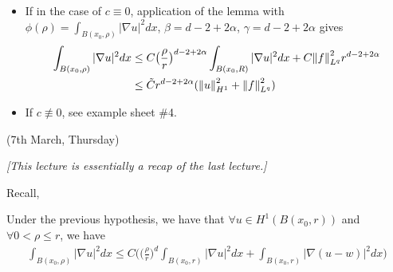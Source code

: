\documentclass[12pt,a4paper]{article}
\newenvironment{proof}
{\begin{changemargin}{0.5cm}{0.5cm} 
	}%
	{\end{changemargin}
}
\newenvironment{subproof}
{\begin{changemargin}{0.5cm}{0.5cm} 
	}%
	{\end{changemargin}
}
\newenvironment{p}
{\begin{proof} 
	}%
	{\end{proof}
}
\begin{document}
\begin{p}
\begin{subproof}
\eos
\end{subproof}
\begin{itemize}
\item If in the case of $c\equiv 0$, application of the lemma with $\phi(\rho) = \int_{B(x_0, \rho)} |\nabla u|^2 dx$, $\beta =d-2+2\alpha$, $\gamma =d-2+2\alpha$ gives
\begin{align*}
\int_{B(x_0, \rho)} |\nabla u|^2 dx & \leq C \big( \frac{\rho}{r} \big)^{d-2+2\alpha} \int_{B(x_0, R)} |\nabla u|^2 dx + C \snorms{f}{L^q}^2 r^{d-2+2\alpha} \\
& \leq \tilde{C} r^{d-2+2\alpha} (\snorms{u}{H^1}^2 + \snorms{f}{L^q}^2)
\end{align*}
\item If $c\not\equiv 0$, see example sheet \#4.
\end{itemize}

\end{p}
\s

\newday

(7th March, Thursday)
\s

\emph{[This lecture is essentially a recap of the last lecture.]}
\s

Recall,

\corr Under the previous hypothesis, we have that $\forall u\in H^1(B(x_0, r))$ and $\forall  0< \rho \leq r$, we have
\begin{align*}
\int_{B(x_0, \rho)} |\nabla u|^2 dx \leq C \Big( \big( \frac{\rho}{r}\big)^d \int_{B(x_0, r)} |\nabla u|^2 dx + \int_{B(x_0, r)} |\nabla(u-w)|^2 dx \Big)
\end{align*}
\eos
\s
\end{document}
